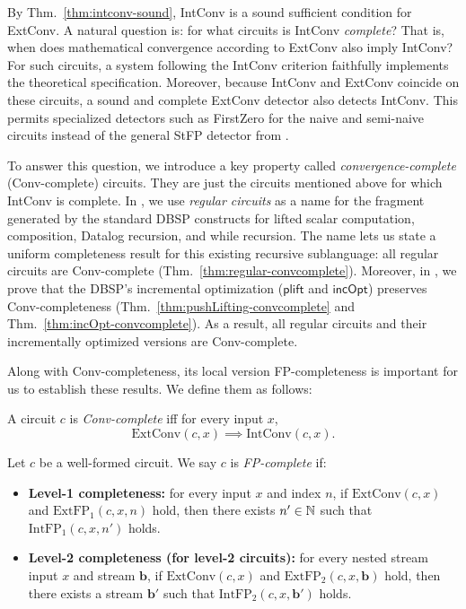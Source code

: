 By Thm.~\ref{thm:intconv-sound}, IntConv is a sound sufficient condition for ExtConv. A natural question is: for what circuits is IntConv \emph{complete}? That is, when does mathematical convergence according to ExtConv also imply IntConv? For such circuits, a system following the IntConv criterion faithfully implements the theoretical specification. Moreover, because IntConv and ExtConv coincide on these circuits, a sound and complete ExtConv detector also detects IntConv. This permits specialized detectors such as FirstZero for the naive and semi-naive circuits instead of the general StFP detector from .

To answer this question, we introduce a key property called \emph{convergence-complete} (Conv-complete) circuits. They are just the circuits mentioned above for which IntConv is complete. In , we use \emph{regular circuits} as a name for the fragment generated by the standard DBSP constructs for lifted scalar computation, composition, Datalog recursion, and while recursion. The name lets us state a uniform completeness result for this existing recursive sublanguage: all regular circuits are Conv-complete (Thm.~\ref{thm:regular-convcomplete}).
Moreover, in , we prove that the DBSP's incremental optimization ($\mathsf{plift}$ and $\mathsf{incOpt}$) preserves Conv-completeness (Thm.~\ref{thm:pushLifting-convcomplete} and Thm.~\ref{thm:incOpt-convcomplete}). As a result, all regular circuits and their incrementally optimized versions are Conv-complete.

Along with Conv-completeness, its local version FP-completeness is important for us to establish these results. We define them as follows:
\begin{definition}
A circuit $c$ is \emph{Conv-complete} iff for every input $x$,
\[
\text{ExtConv}(c, x) \implies \text{IntConv}(c, x).
\]
\end{definition}
\begin{definition}
Let $c$ be a well-formed circuit.
We say $c$ is \emph{FP-complete} if:
\begin{itemize}
    \item \textbf{Level-1 completeness:}
    for every input $x$ and index $n$, if $\text{ExtConv}(c, x)$ and $\text{ExtFP}_1(c, x, n)$ hold, then there exists $n' \in \mathbb{N}$ such that $\text{IntFP}_1(c, x, n')$ holds.
    \item \textbf{Level-2 completeness (for level-2 circuits):}
    for every nested stream input $x$ and stream $\mathbf{b}$, if $\text{ExtConv}(c, x)$ and $\text{ExtFP}_2(c, x, \mathbf{b})$ hold, then there exists a stream $\mathbf{b}'$ such that $\text{IntFP}_2(c, x, \mathbf{b}')$ holds.
\end{itemize}
\end{definition}

